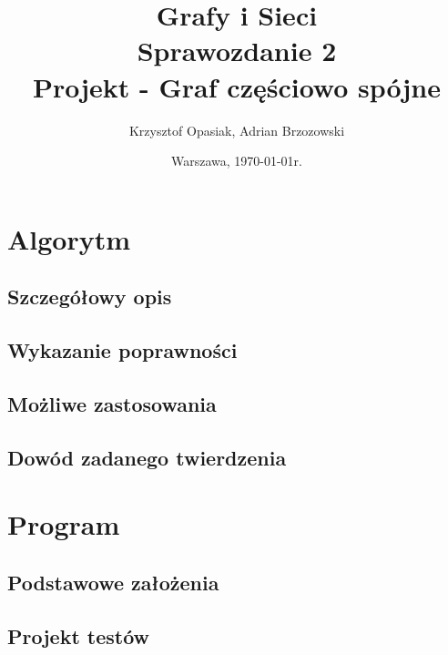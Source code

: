 \documentclass[a4paper,10pt]{article}
\title{{\textbf{Grafy i Sieci}}\\[1ex]
       {\Large Sprawozdanie 2}\\[-1ex]
       {\Large Projekt - Graf częściowo spójne}}
\author{Krzysztof Opasiak, Adrian Brzozowski}
\date{Warszawa, \today r.}
\begin{document}
\maketitle

\section{Algorytm}

\subsection{Szczegółowy opis}
\subsection{Wykazanie poprawności}
\subsection{Możliwe zastosowania}
\subsection{Dowód zadanego twierdzenia}
\section{Program}
\subsection{Podstawowe założenia}
\subsection{Projekt testów}
\end{document}
